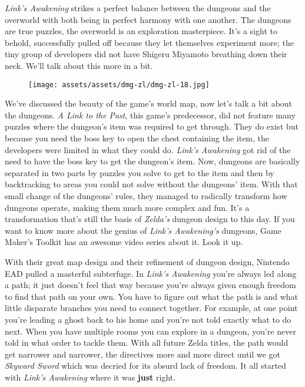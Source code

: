\documentclass{book}
\begin{document}
\emph{Link’s Awakening} strikes a perfect balance between the dungeons and the overworld with both being in perfect harmony with one another. The dungeons are true puzzles, the overworld is an exploration masterpiece. It’s a sight to behold, successfully pulled off because they let themselves experiment more; the tiny group of developers did not have Shigeru Miyamoto breathing down their neck. We’ll talk about this more in a bit.

\begin{figure}[hbt]
\vskip 10pt
\centering \texttt{[image: assets/assets/dmg-zl/dmg-zl-18.jpg]}
\vskip 6pt
\end{figure}

We’ve discussed the beauty of the game’s world map, now let’s talk a bit about the dungeons. \emph{A Link to the Past}, this game’s predecessor, did not feature many puzzles where the dungeon’s item was required to get through. They do exist but because you need the boss key to open the chest containing the item, the developers were limited in what they could do. \emph{Link’s Awakening} got rid of the need to have the boss key to get the dungeon’s item. Now, dungeons are basically separated in two parts by puzzles you solve to get to the item and then by backtracking to areas you could not solve without the dungeons’ item. With that small change of the dungeons’ rules, they managed to radically transform how dungeons operate, making them much more complex and fun. It’s a transformation that’s still the basis of \emph{Zelda’s} dungeon design to this day. If you want to know more about the genius of \emph{Link’s Awakening’s} dungeons, Game Maker’s Toolkit has an awesome video series about it. Look it up.

With their great map design and their refinement of dungeon design, Nintendo EAD pulled a masterful subterfuge. In \emph{Link’s Awakening} you’re always led along a path; it just doesn’t feel that way because you’re always given enough freedom to find that path on your own. You have to figure out what the path is and what little disparate branches you need to connect together. For example, at one point you’re leading a ghost back to his home and you’re not told exactly what to do next. When you have multiple rooms you can explore in a dungeon, you’re never told in what order to tackle them. With all future Zelda titles, the path would get narrower and narrower, the directives more and more direct until we got \emph{Skyward Sword} which was decried for its absurd lack of freedom. It all started with \emph{Link’s Awakening} where it was \textbf{just} right.
\end{document}
